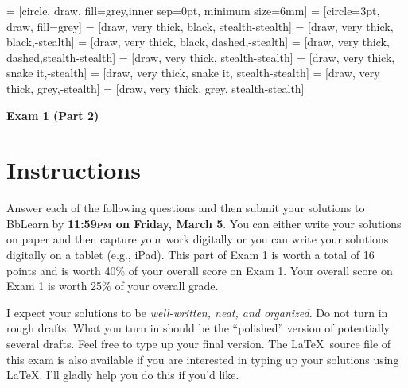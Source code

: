\documentclass[11pt]{article}
\theoremstyle{definition}
\begin{document}
 = [circle, draw, fill=grey,inner sep=0pt, minimum size=6mm]
 = [circle=3pt, draw, fill=grey]
 = [draw, very  thick, black, stealth-stealth]
 = [draw, very  thick, black,-stealth]
 = [draw, very  thick, black, dashed,-stealth]
 = [draw, very thick, dashed,stealth-stealth]
 = [draw, very thick, stealth-stealth]
 = [draw, very thick, snake it,-stealth]
 = [draw, very thick, snake it, stealth-stealth]
 = [draw, very thick, grey,-stealth]
 = [draw, very thick, grey, stealth-stealth]

\begin{center}

{\Large\bf Exam 1 (Part 2)}

\bigskip

  
  \bigskip
  

\end{center}

\section*{Instructions}

Answer each of the following questions and then submit your solutions to BbLearn by \textbf{11:59\textsc{pm} on Friday, March 5}. You can either write your solutions on paper and then capture your work digitally or you can write your solutions digitally on a tablet (e.g., iPad). This part of Exam 1 is worth a total of 16 points and is worth 40\% of your overall score on Exam 1. Your overall score on Exam 1 is worth 25\% of your overall grade.

\bigskip

I expect your solutions to be \emph{well-written, neat, and organized}.  Do not turn in rough drafts.  What you turn in should be the ``polished'' version of potentially several drafts.  Feel free to type up your final version.  The \LaTeX\ source file of this exam is also available if you are interested in typing up your solutions using \LaTeX.  I'll gladly help you do this if you'd like.
\end{document}
